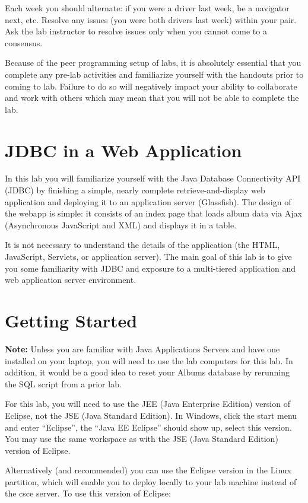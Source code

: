 \documentclass[12pt]{scrartcl}
\begin{document}
Each week you should alternate: if you were a driver last week, 
be a navigator next, etc.  Resolve any issues (you were both drivers
last week) within your pair.  Ask the lab instructor to resolve issues
only when you cannot come to a consensus.  

Because of the peer programming setup of labs, it is absolutely 
essential that you complete any pre-lab activities and familiarize
yourself with the handouts prior to coming to lab.  Failure to do
so will negatively impact your ability to collaborate and work with 
others which may mean that you will not be able to complete the
lab.  

\section*{JDBC in a Web Application}

In this lab you will familiarize yourself with the Java Database 
Connectivity API (JDBC) by finishing a simple, nearly complete 
retrieve-and-display web application and deploying it to an 
application server (Glassfish).  The design of the webapp is 
simple: it consists of an index page that loads album data 
via Ajax (Asynchronous JavaScript and XML) and displays it in
a table.  

It is not necessary to understand the details of the application 
(the HTML, JavaScript, Servlets, or application server).  The 
main goal of this lab is to give you some familiarity with JDBC 
and exposure to a multi-tiered application and web application 
server environment.

\section*{Getting Started}

\textbf{Note:} Unless you are familiar with Java Applications Servers 
and have one installed on your laptop, you will need to use the lab 
computers for this lab.  In addition, it would be a good idea to reset 
your Albums database by rerunning the SQL script from a prior lab.

For this lab, you will need to use the JEE (Java Enterprise Edition) 
version of Eclipse, not the JSE (Java Standard Edition).  In Windows, 
click the start menu and enter ``Eclipse'', the ``Java EE Eclipse'' 
should show up, select this version.  You may use the same workspace 
as with the JSE (Java Standard Edition) version of Eclipse.

Alternatively (and recommended) you can use the Eclipse version in the 
Linux partition, which will enable you to deploy locally to your lab 
machine instead of the csce server.  To use this version of Eclipse: 
\end{document}
